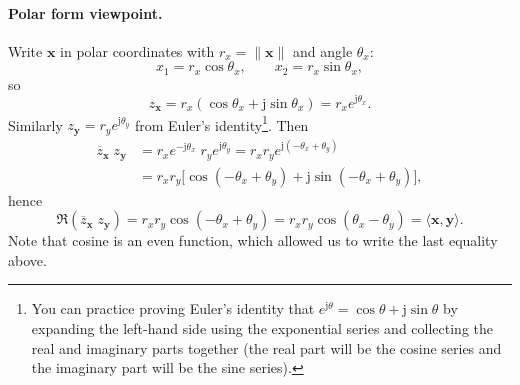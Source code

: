 \documentclass{ee102_notes}
\begin{document}
\paragraph{Polar form viewpoint.}
Write $\mathbf{x}$ in polar coordinates with $r_x=\|\mathbf{x}\|$ and angle
$\theta_x$:
\[
x_1=r_x\cos\theta_x,\qquad x_2=r_x\sin\theta_x,
\]
so
\[
z_{\mathbf{x}}=r_x(\cos\theta_x+\mathrm{j}\sin\theta_x)=r_x e^{\mathrm{j}\theta_x}.
\]
Similarly $z_{\mathbf{y}}=r_y e^{\mathrm{j}\theta_y}$ from Euler's identity\footnote{You can practice proving Euler's identity that $e^{\mathrm{j}\theta}=\cos\theta+\mathrm{j}\sin\theta$ by expanding the left-hand side using the exponential series and collecting the real and imaginary parts together (the real part will be the cosine series and the imaginary part will be the sine series).}. Then
\begin{align*}
\overline{z}_{\mathbf{x}}\;z_{\mathbf{y}}
&= r_x e^{-\mathrm{j}\theta_x}\; r_y e^{\mathrm{j}\theta_y}
= r_x r_y e^{\mathrm{j}(-\theta_x+\theta_y)} \\
&= r_x r_y\Big[\cos(-\theta_x+\theta_y)
  + \mathrm{j}\sin(-\theta_x+\theta_y)\Big],
\end{align*}
hence
\[
\Re\!\left(\overline{z}_{\mathbf{x}}\;z_{\mathbf{y}}\right)
= r_x r_y \cos(-\theta_x+\theta_y) = r_x r_y \cos(\theta_x - \theta_y)
= \langle \mathbf{x},\mathbf{y}\rangle .
\]
Note that cosine is an even function, which allowed us to write the last equality above. 
\end{document}

